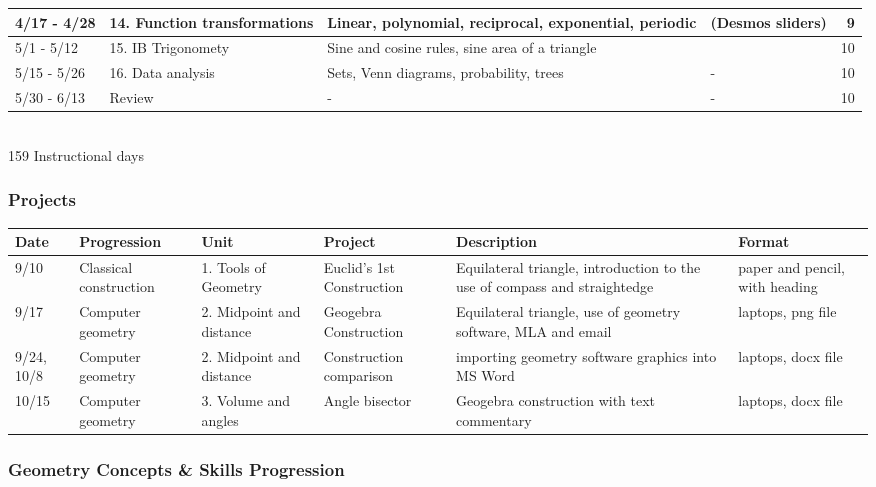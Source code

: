 \documentclass[12pt, twoside]{article}
\begin{document}
\begin{tabular}{|p{2.9cm}|p{4.7cm}|p{8cm}|p{5cm}|r|}
  4/17 - 4/28 & 14. Function transformations & Linear, polynomial, reciprocal, exponential, periodic & (Desmos sliders) & 9 \\
  \hline
  5/1 - 5/12 & 15. IB Trigonomety & Sine and cosine rules, sine area of a triangle & & 10 \\
  \hline
  5/15 - 5/26 & 16. Data analysis & Sets, Venn diagrams, probability, trees & - & 10 \\
  \hline
  5/30 - 6/13 & Review & - & - & 10 \\
  \hline
\end{tabular} \\[0.25cm]
159 Instructional days

\newpage
\subsubsection*{Projects}

\begin{tabular}{|p{1cm}|p{2.5cm}|p{3cm}|p{4cm}|p{8cm}|p{4cm}|}
  \hline
  Date & Progression & Unit & Project & Description & Format \\
  \hline
  9/10 & Classical construction & 1. Tools of Geometry & Euclid's 1st Construction & Equilateral triangle, introduction to the use of compass and straightedge & paper and pencil, with heading \\
  \hline
  9/17 & Computer geometry & 2. Midpoint and distance & Geogebra Construction & Equilateral triangle, use of geometry software, MLA and email & laptops, png file \\
  \hline
  9/24, 10/8 & Computer geometry & 2. Midpoint and distance & Construction comparison & importing geometry software graphics into MS Word & laptops, docx file \\
  \hline
  10/15 & Computer geometry & 3. Volume and angles & Angle bisector & Geogebra construction with text commentary & laptops, docx file \\
  \hline
\end{tabular}

\newpage
\subsubsection*{Geometry Concepts \& Skills Progression}
\end{document}
